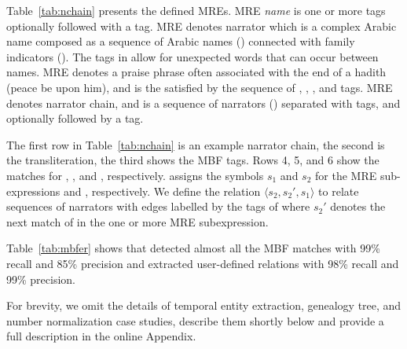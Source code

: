 Table~\ref{tab:nchain} presents the defined MREs. 
MRE {\em name} is one or more  tags optionally followed 
with a  tag. 
MRE  denotes narrator which is a complex Arabic name
composed as a sequence of Arabic names () 
connected with family indicators (). 
The  tags in  allow for unexpected words 
that can occur between names. 
MRE  denotes a praise phrase often associated with 
the end of a hadith (peace be upon him), 
and is the satisfied by the sequence of
, , , and  tags. 
MRE  denotes narrator chain, 
and is a sequence of narrators ()
separated with  tags, and optionally followed
by a  tag. 

The first row in Table~\ref{tab:nchain} is an example narrator chain,
the second is the transliteration, the third 
shows the MBF tags. Rows 4, 5, and 6 show the 
matches for , , and ,
respectively.
%
\framework assigns the symbols $s_1$ and $s_2$ for the 
MRE sub-expressions  and , respectively. 
We define the relation $\langle s_2,s_2',s_1\rangle$ 
to relate sequences of narrators with edges labelled by the tags of  where 
$s_2'$ denotes the next match of  in the one or more MRE subexpression.

Table~\ref{tab:mbfer} shows that \framework detected almost all the MBF matches 
with 99\% recall and 85\% precision and 
extracted user-defined relations with 98\% recall and 99\% precision.

For brevity, we omit the details of \framework temporal entity extraction, 
genealogy tree, and number normalization case studies, describe them shortly
below and provide a full description in the online Appendix.

